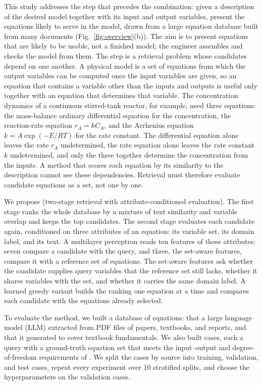 This study addresses the step that precedes the combination: given a description of the desired
model together with its input and output variables, present the equations likely to serve in the
model, drawn from a large equation database built from many documents
(Fig.~\ref{fig:overview}(b)). The aim is to present equations that are likely to be usable, not a
finished model; the engineer assembles and checks the model from them. The step is a retrieval
problem whose candidates depend on one another. A physical model is a set of equations from which
the output variables can be computed once the input variables are given, so an equation that
contains a variable other than the inputs and outputs is useful only together with an equation that
determines that variable. The concentration dynamics of a continuous stirred-tank reactor, for
example, need three equations: the mass-balance ordinary differential equation for the
concentration, the reaction-rate equation $r_A = k C_A$, and the Arrhenius equation
$k = A\exp(-E/RT)$ for the rate constant. The differential equation alone leaves the rate $r_A$
undetermined, the rate equation alone leaves the rate constant $k$ undetermined, and only the three
together determine the concentration from the inputs. A method that scores each equation by its
similarity to the description cannot see these dependencies. Retrieval must therefore evaluate
candidate equations as a set, not one by one.

We propose \ours{} (two-stage retrieval with attribute-conditioned evaluation). The first stage
ranks the whole database by a mixture of text similarity and variable overlap and keeps the top
candidates. The second stage evaluates each candidate again, conditioned on three attributes of an
equation: its variable set, its domain label, and its text. A multilayer perceptron reads ten
features of these attributes: seven compare a candidate with the query, and three, the set-aware
features, compare it with a reference set of equations. The set-aware features ask whether the
candidate supplies query variables that the reference set still lacks, whether it shares variables
with the set, and whether it carries the same domain label. A learned greedy variant builds the
ranking one equation at a time and compares each candidate with the equations already selected.

To evaluate the method, we built a database of \NEq{} equations: \NEqPdf{} that a large language
model (LLM) extracted from \NPdf{} PDF files of papers, textbooks, and reports, and \NEqRef{} that
it generated to cover textbook fundamentals. We also built \NCases{} cases, each a query with a
ground-truth equation set that meets the input--output and degree-of-freedom requirements of
\citet{CombineEq}. We split the cases by source into training,
validation, and test cases, repeat every experiment over 10 stratified splits, and choose the
hyperparameters on the validation cases.


